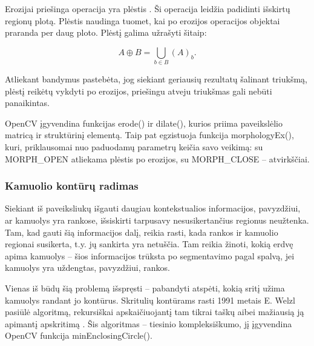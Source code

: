\documentclass{VUMIFPSbakalaurinis}
\begin{document}
Erozijai priešinga operacija yra plėstis \cite{4767941}. Ši operacija leidžia padidinti išskirtų regionų plotą. Plėstis naudinga tuomet, kai po erozijos operacijos objektai praranda per daug ploto. Plėstį galima užrašyti šitaip:

\begin{equation}\label{eq:plestis}
	A \oplus B = \bigcup_ {b \in B } (A)_{b} .
\end{equation}

Atliekant bandymus pastebėta, jog siekiant geriausių rezultatų šalinant triukšmą, plėstį reikėtų vykdyti po erozijos, priešingu atveju triukšmas gali nebūti panaikintas. 

OpenCV įgyvendina funkcijas erode() ir dilate(), kurios priima paveikslėlio matricą ir struktūrinį elementą. Taip pat egzistuoja funkcija morphologyEx(), kuri, priklausomai nuo paduodamų parametrų keičia savo veikimą: su MORPH\_OPEN atliekama plėstis po erozijos, su MORPH\_CLOSE – atvirkščiai. 

\subsubsection{Kamuolio kontūrų radimas}

Siekiant iš paveiksliukų išgauti daugiau kontekstualios informacijos, pavyzdžiui, ar kamuolys yra rankose, išsiskirti tarpusavy nesusikertančius regionus neužtenka. Tam, kad gauti šią informacijos dalį, reikia rasti, kada rankos ir kamuolio regionai susikerta, t.y. jų sankirta yra netuščia. Tam reikia žinoti, kokią erdvę apima kamuolys – šios informacijos trūksta po segmentavimo pagal spalvą, jei kamuolys yra uždengtas, pavyzdžiui, rankos. 

Vienas iš būdų šią problemą išspręsti – pabandyti atspėti, kokią sritį užima kamuolys randant jo kontūrus. Skritulių kontūrams rasti 1991 metais E. Welzl pasiūlė algoritmą, rekursiškai apskaičiuojantį tam tikrai taškų aibei mažiausią ją apimantį apskritimą \cite{Welzl91smallestenclosing}. Šis algoritmas – tiesinio kompleksiškumo, jį įgyvendina OpenCV funkcija minEnclosingCircle().       
\end{document}
